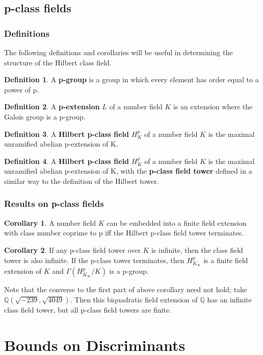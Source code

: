 \documentclass[12pt]{extarticle}
\newcommand{\<}{\langle}
\renewcommand{\>}{\rangle}
\theoremstyle{definition}
\newtheorem{corollary}{Corollary}
\newtheorem*{definition}{Definition}
\begin{document}
\subsection{p-class fields}
\subsubsection*{Definitions}
The following definitions and corollaries will be useful in determining the structure of the Hilbert class field. 
\begin{definition}
A \textbf{p-group} is a group in which every element has order equal to a power of p.
\end{definition}
\begin{definition}
A \textbf{p-extension} $L$ of a number field $K$ is an extension where the Galois group is a p-group.
\end{definition}
\begin{definition}
A \textbf{Hilbert p-class field} $H_K^{p}$ of a number field $K$ is the maximal unramified abelian p-extension of K.
\end{definition}
\begin{definition}
A \textbf{Hilbert p-class field} $H_K^{p}$ of a number field $K$ is the maximal unramified abelian p-extension of K, with the \textbf{p-class field tower} defined in a similar way to the definition of the Hilbert tower. 
\end{definition}

\subsubsection{Results on p-class fields }
\begin{corollary}
 A number field $K$ can be embedded into a finite field extension with class number coprime to p iff the Hilbert p-class field tower terminates.
\end{corollary}
\begin{corollary}
If any p-class field tower over $K$ is infinite, then the class field tower is also infinite. If the p-class tower terminates, then $H_{K_\infty}^{p}$ is a finite field extension of $K$ and $\Gamma(H_{K_\infty}^{p}/K)$ is a p-group.
\end{corollary}
Note that the converse to the first part of above corollary need not hold; take $\mathbb{Q}\left(\sqrt{-239},\sqrt{4049}\right)$. Then this biquadratic field extension of $\mathbb{Q}$ has an infinite class field tower, but all p-class field towers are finite.
\section{Bounds on Discriminants}
\end{document}
